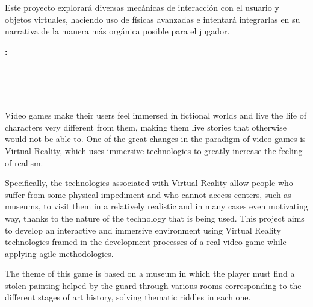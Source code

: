 \bigskip

Este proyecto explorará diversas mecánicas de interacción con el usuario y objetos virtuales, haciendo uso de físicas avanzadas e intentará integrarlas en su narrativa de la manera más orgánica posible para el jugador. 


\thispagestyle{empty}

\cleardoublepage

\begin{center}
	{\large\bfseries \myTitle: \myEnglishSubtitle}\\
\end{center}

\begin{center}
	\myName \\
\end{center}

\vspace{0.7cm}
\\

\vspace{0.7cm}
\\


Video games make their users feel immersed in fictional worlds and live the life of characters very different from them, making them live stories that otherwise would not be able to. One of the great changes in the paradigm of video games is Virtual Reality, which uses immersive technologies to greatly increase the feeling of realism.

\bigskip

Specifically, the technologies associated with Virtual Reality allow people who suffer from some physical impediment and who cannot access centers, such as museums, to visit them in a relatively realistic and in many cases even motivating way, thanks to the nature of the technology that is being used. This project aims to develop an interactive and immersive environment using Virtual Reality technologies framed in the development processes of a real video game while applying agile methodologies.


\bigskip

The theme of this game is based on a museum in which the player must find a stolen painting helped by the guard through various rooms corresponding to the different stages of art history, solving thematic riddles in each one.

\bigskip

